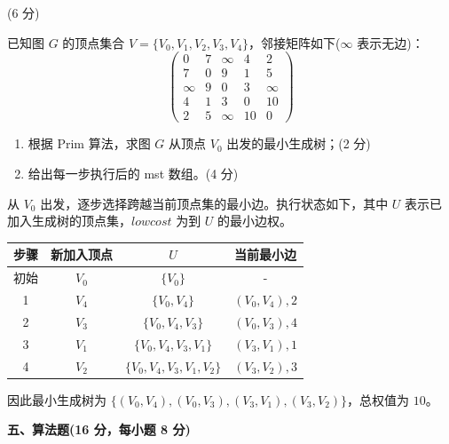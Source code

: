 \begin{question}[Prim算法求最小生成树](6 分)

已知图 $G$ 的顶点集合 $V=\{V_0,V_1,V_2,V_3,V_4\}$，邻接矩阵如下($\infty$ 表示无边)：
\[
\begin{pmatrix}
0 & 7 & \infty & 4 & 2\\
7 & 0 & 9 & 1 & 5\\
\infty & 9 & 0 & 3 & \infty\\
4 & 1 & 3 & 0 & 10\\
2 & 5 & \infty & 10 & 0
\end{pmatrix}
\]

\begin{enumerate}[label=\arabic*)]
  \item 根据 Prim 算法，求图 $G$ 从顶点 $V_0$ 出发的最小生成树；(2 分)
  \item 给出每一步执行后的 mst 数组。(4 分)
\end{enumerate}

\begin{solution}
从 $V_0$ 出发，逐步选择跨越当前顶点集的最小边。执行状态如下，其中 $U$ 表示已加入生成树的顶点集，$lowcost$ 为到 $U$ 的最小边权。
\begin{center}
\small
\begin{tabular}{c c c c}
\toprule
步骤 & 新加入顶点 & $U$ & 当前最小边 \\ 
\midrule
初始 & $V_0$ & $\{V_0\}$ & - \\ 
1 & $V_4$ & $\{V_0,V_4\}$ & $(V_0,V_4),2$ \\ 
2 & $V_3$ & $\{V_0,V_4,V_3\}$ & $(V_0,V_3),4$ \\ 
3 & $V_1$ & $\{V_0,V_4,V_3,V_1\}$ & $(V_3,V_1),1$ \\ 
4 & $V_2$ & $\{V_0,V_4,V_3,V_1,V_2\}$ & $(V_3,V_2),3$ \\ 
\bottomrule
\end{tabular}
\end{center}
因此最小生成树为 $\{(V_0,V_4),(V_0,V_3),(V_3,V_1),(V_3,V_2)\}$，总权值为 $10$。
\end{solution}
\end{question}

\textbf{五、算法题(16 分，每小题 8 分)}


